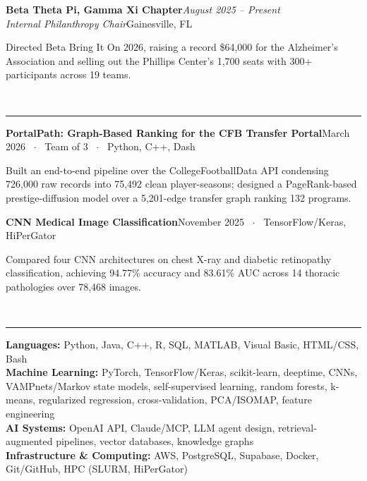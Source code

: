 \documentclass[10pt,letterpaper]{article}
\newcommand{\rsection}[1]{%
  \vspace{0.3em}%
  \noindent{\bfseries\scshape #1}\\[-0.42em]
  \noindent\rule{\textwidth}{0.6pt}\par\vspace{0.12em}%
}
\newenvironment{tight}{%
  \begin{list}{\textbullet}{%
    \setlength{\leftmargin}{1.1em}%
    \setlength{\labelwidth}{0.8em}%
    \setlength{\labelsep}{0.4em}%
    \setlength{\itemsep}{0.03em}%
    \setlength{\parsep}{0pt}%
    \setlength{\topsep}{0.09em}%
    \setlength{\partopsep}{0pt}%
    \setlength{\listparindent}{0pt}%
  }%
}{\end{list}}
\newcommand{\entry}[4]{%
  \vspace{0.12em}%
  \noindent\textbf{#1}\hfill\textit{#2}\\[0.02em]
  \noindent\textit{#3}\hfill{\small #4}\par\vspace{0.02em}%
}
\newcommand{\proj}[2]{%
  \vspace{0.15em}%
  \noindent\textbf{#1}\hfill{\small #2}\par\vspace{0.0em}%
}
\begin{document}
\entry{Beta Theta Pi, Gamma Xi Chapter}{August 2025 -- Present}{Internal Philanthropy Chair}{Gainesville, FL}
\begin{tight}
  \item Directed Beta Bring It On 2026, raising a record \$64,000 for the Alzheimer's Association and selling out the Phillips Center's 1,700 seats with 300+ participants across 19 teams.
\end{tight}

\rsection{Projects}

\proj{PortalPath: Graph-Based Ranking for the CFB Transfer Portal}{March 2026 \ $\cdot$ \ Team of 3 \ $\cdot$ \ Python, C++, Dash}
\begin{tight}
  \item Built an end-to-end pipeline over the CollegeFootballData API condensing 726,000 raw records into 75,492 clean player-seasons; designed a PageRank-based prestige-diffusion model over a 5,201-edge transfer graph ranking 132 programs.
\end{tight}

\proj{CNN Medical Image Classification}{November 2025 \ $\cdot$ \ TensorFlow/Keras, HiPerGator}
\begin{tight}
  \item Compared four CNN architectures on chest X-ray and diabetic retinopathy classification, achieving 94.77\% accuracy and 83.61\% AUC across 14 thoracic pathologies over 78,468 images.
\end{tight}

\rsection{Skills}

\textbf{Languages:} Python, Java, C++, R, SQL, MATLAB, Visual Basic, HTML/CSS, Bash \\
\textbf{Machine Learning:} PyTorch, TensorFlow/Keras, scikit-learn, deeptime, CNNs, VAMPnets/Markov state models, self-supervised learning, random forests, k-means, regularized regression, cross-validation, PCA/ISOMAP, feature engineering \\
\textbf{AI Systems:} OpenAI API, Claude/MCP, LLM agent design, retrieval-augmented pipelines, vector databases, knowledge graphs \\
\textbf{Infrastructure \& Computing:} AWS, PostgreSQL, Supabase, Docker, Git/GitHub, HPC (SLURM, HiPerGator)
\end{document}
